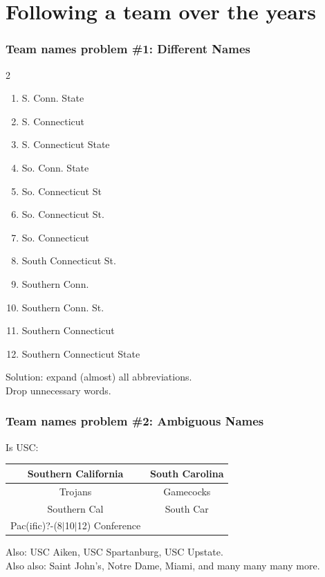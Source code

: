 \documentclass{beamer}
\begin{document}
\section{Following a team over the years}

\begin{frame}
\insertsectionhead
\end{frame}

\begin{frame}
\frametitle{Team names problem \#1: Different Names}
\begin{multicols}{2}
\begin{enumerate}
\item S. Conn. State
\item S. Connecticut
\item S. Connecticut State
\item So. Conn. State
\item So. Connecticut St
\item So. Connecticut St.
\item So. Connecticut
\item South Connecticut St.
\item Southern Conn.
\item Southern Conn. St.
\item \alert{Southern Connecticut}
\item Southern Connecticut State
\end{enumerate}
\end{multicols}
Solution: expand (almost) all abbreviations.\\
Drop unnecessary words.
\end{frame}

\begin{frame}
\frametitle{Team names problem \#2: Ambiguous Names}
Is USC:
\begin{center}
\begin{tabular}{c @{\qquad} c}\toprule
Southern California & South Carolina \\\midrule
Trojans & Gamecocks \\
Southern Cal & South Car \\
Pac(ific)?-(8$|$10$|$12) Conference \\\bottomrule
\end{tabular}
\end{center}
Also: USC Aiken, USC Spartanburg, USC Upstate.\\\bigskip
Also also: Saint John's, Notre Dame, Miami, and many many many more.
\end{frame}
\end{document}
